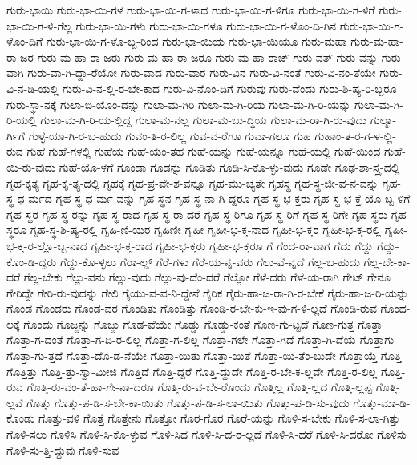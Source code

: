 {ಗುರು-ಭಾಯಿ
ಗುರು-ಭಾ-ಯಿ-ಗಳ
ಗುರು-ಭಾ-ಯಿ-ಗ-ಳಾದ
ಗುರು-ಭಾ-ಯಿ-ಗ-ಳಿಗೂ
ಗುರು-ಭಾ-ಯಿ-ಗ-ಳಿಗೆ
ಗುರು-ಭಾ-ಯಿ-ಗ-ಳಿ-ಗೆಲ್ಲ
ಗುರು-ಭಾ-ಯಿ-ಗಳು
ಗುರು-ಭಾ-ಯಿ-ಗಳೂ
ಗುರು-ಭಾ-ಯಿ-ಗ-ಳೊಂ-ದಿ-ಗಿನ
ಗುರು-ಭಾ-ಯಿ-ಗ-ಳೊಂ-ದಿಗೆ
ಗುರು-ಭಾ-ಯಿ-ಗ-ಳೊ-ಬ್ಬ-ರಿಂದ
ಗುರು-ಭಾ-ಯಿಯ
ಗುರು-ಭಾ-ಯಿಯೂ
ಗುರು-ಮಹಾ
ಗುರು-ಮ-ಹಾ-ರಾ-ಜರ
ಗುರು-ಮ-ಹಾ-ರಾ-ಜರು
ಗುರು-ಮ-ಹಾ-ರಾ-ಜರೂ
ಗುರು-ಮ-ಹಾ-ರಾಜ್
ಗುರು-ವತ್
ಗುರು-ವನ್ನು
ಗುರು-ವಾಗಿ
ಗುರು-ವಾ-ಗಿ-ದ್ದಾ-ರೆಯೋ
ಗುರು-ವಾದ
ಗುರು-ವಾರ
ಗುರು-ವಿನ
ಗುರು-ವಿ-ನಂತೆ
ಗುರು-ವಿ-ನಂ-ತೆಯೇ
ಗುರು-ವಿ-ನ-ಡಿ-ಯಲ್ಲಿ
ಗುರು-ವಿ-ನ-ಲ್ಲಿ-ರ-ಬೇ-ಕಾದ
ಗುರು-ವಿ-ನೊಂ-ದಿಗೆ
ಗುರುವು
ಗುರು-ವೆಂದು
ಗುರು-ಶಿ-ಷ್ಯ-ರಿ-ಬ್ಬರೂ
ಗುರು-ಸ್ಥಾ-ನಕ್ಕೆ
ಗುಲಾ-ಬಿ-ಯೊಂ-ದನ್ನು
ಗುಲಾ-ಮ-ಗಿರಿ
ಗುಲಾ-ಮ-ಗಿ-ರಿಯ
ಗುಲಾ-ಮ-ಗಿ-ರಿ-ಯನ್ನು
ಗುಲಾ-ಮ-ಗಿ-ರಿ-ಯಲ್ಲಿ
ಗುಲಾ-ಮ-ಗಿ-ರಿ-ಯ-ಲ್ಲಿದ್ದ
ಗುಲಾ-ಮ-ನಲ್ಲ
ಗುಲಾ-ಮ-ಬು-ದ್ಧಿಯ
ಗುಲಾ-ಮ-ರಾ-ಗಿ-ರು-ವುದು
ಗುಲ್ಮಾ-ರ್ಗಿಗೆ
ಗುಳ್ಳೆ-ಯಾ-ಗಿ-ರ-ಬ-ಹುದು
ಗುವಂ-ತಿ-ರ-ಲಿಲ್ಲ
ಗುವ-ವ-ರೆಗೂ
ಗುವಾ-ಗಲೂ
ಗುಹ
ಗುಹಾಂ-ತ-ರ-ಗ-ಳ-ಲ್ಲಿ-ರುವ
ಗುಹೆ
ಗುಹೆ-ಗಳಲ್ಲಿ
ಗುಹೆಯ
ಗುಹೆ-ಯಂ-ತಹ
ಗುಹೆ-ಯನ್ನು
ಗುಹೆ-ಯನ್ನೂ
ಗುಹೆ-ಯಲ್ಲಿ
ಗುಹೆ-ಯಿಂದ
ಗುಹೆ-ಯಿ-ರು-ವುದು
ಗುಹೆ-ಯೊ-ಳಗೆ
ಗೂಂಡಾ
ಗೂಡನ್ನು
ಗೂಡಿತು
ಗೂಡಿ-ಸಿ-ಕೊ-ಳ್ಳು-ವುದು
ಗೂಡೇ
ಗೂಢ-ಶಾ-ಸ್ತ್ರ-ದಲ್ಲಿ
ಗೃಹ-ಕೃತ್ಯ
ಗೃಹ-ಕೃ-ತ್ಯ-ದಲ್ಲಿ
ಗೃಹಕ್ಕೆ
ಗೃಹ-ಪ್ರ-ವೇ-ಶ-ವನ್ನೂ
ಗೃಹ-ಮು-ಚ್ಯತೇ
ಗೃಹಸ್ಥ
ಗೃಹ-ಸ್ಥ-ಜೀ-ವ-ನ-ವನ್ನು
ಗೃಹ-ಸ್ಥ-ಧ-ರ್ಮದ
ಗೃಹ-ಸ್ಥ-ಧ-ರ್ಮ-ವನ್ನು
ಗೃಹ-ಸ್ಥನ
ಗೃಹ-ಸ್ಥ-ನಾ-ಗಿ-ದ್ದರೂ
ಗೃಹ-ಸ್ಥ-ಭ-ಕ್ತರು
ಗೃಹ-ಸ್ಥ-ಭ-ಕ್ತೆ-ಯೊ-ಬ್ಬ-ಳಿಗೆ
ಗೃಹ-ಸ್ಥರ
ಗೃಹ-ಸ್ಥ-ರನ್ನು
ಗೃಹ-ಸ್ಥ-ರಾದ
ಗೃಹ-ಸ್ಥ-ರಾ-ದರೆ
ಗೃಹ-ಸ್ಥ-ರಿಗೂ
ಗೃಹ-ಸ್ಥ-ರಿಗೆ
ಗೃಹ-ಸ್ಥ-ರಿಗೇ
ಗೃಹ-ಸ್ಥರು
ಗೃಹ-ಸ್ಥರೂ
ಗೃಹ-ಸ್ಥ-ಶಿ-ಷ್ಯ-ರಲ್ಲಿ
ಗೃಹಿ-ಣಿ-ಯರ
ಗೃಹಿಣೀ
ಗೃಹೀ
ಗೃಹೀ-ಭ-ಕ್ತ-ನಾದ
ಗೃಹೀ-ಭ-ಕ್ತರ
ಗೃಹೀ-ಭ-ಕ್ತ-ರಲ್ಲಿ
ಗೃಹೀ-ಭ-ಕ್ತ-ರ-ಲ್ಲೊ-ಬ್ಬ-ನಾದ
ಗೃಹೀ-ಭ-ಕ್ತ-ರಾದ
ಗೃಹೀ-ಭ-ಕ್ತರು
ಗೃಹೀ-ಭ-ಕ್ತರೂ
ಗೆ
ಗೆಂದ-ರಾ-ವಾಗ
ಗೆದು
ಗೆದ್ದು
ಗೆದ್ದು-ಕೊಂ-ಡಿ-ದ್ದರು
ಗೆದ್ದು-ಕೊ-ಳ್ಳಲು
ಗೆರಾ-ಲ್ಡ್
ಗೆರೆ-ಗಳು
ಗೆರೆ-ಯ-ನ್ನ-ವರು
ಗೆಲು-ವೆ-ನ್ನದೆ
ಗೆಲ್ಲ-ಬ-ಹುದು
ಗೆಲ್ಲ-ಬೇ-ಕಾ-ದರೆ
ಗೆಲ್ಲ-ಬೇಕು
ಗೆಲ್ಲು-ವನು
ಗೆಲ್ಲು-ವುದು
ಗೆಲ್ಲು-ವು-ದೆಂ-ದರೆ
ಗೆಲ್ಲೋ
ಗೆಳೆ-ದರು
ಗೆಳೆ-ಯ-ರಾಗಿ
ಗೇಟ್
ಗೇನೂ
ಗೇರಿದ್ದೇ
ಗೇರಿ-ರು-ವುದನ್ನು
ಗೇಲಿ
ಗೈಯು-ವ-ವ-ನಿ-ದ್ದೇನೆ
ಗೈರಿಕ
ಗೈರು-ಹಾ-ಜ-ರಾ-ಗಿ-ರ-ಬೇಕೆ
ಗೈರು-ಹಾ-ಜ-ರಿ-ಯನ್ನು
ಗೊಂಡ
ಗೊಂಡರು
ಗೊಂಡ-ವರ
ಗೊಂಡಿತು
ಗೊಂಡಿತ್ತು
ಗೊಂಡಿ-ರ-ಬೇ-ಕು-ಇ-ವು-ಗ-ಳಿ-ಲ್ಲದೆ
ಗೊಂಡಿ-ರುವ
ಗೊಂದ-ಲಕ್ಕೆ
ಗೊಂದು
ಗೊಜ್ಜನ್ನು
ಗೊಜ್ಜು
ಗೊಡ-ವೆಯೇ
ಗೊಡ್ಡು
ಗೊಡ್ಡು-ಕಂತೆ
ಗೊಣ-ಗು-ಟ್ಟದೆ
ಗೊಣ-ಗುತ್ತ
ಗೊತ್ತಾ
ಗೊತ್ತಾ-ಗ-ದಂತೆ
ಗೊತ್ತಾ-ಗ-ದಿ-ರ-ಲಿಲ್ಲ
ಗೊತ್ತಾ-ಗ-ಲಿಲ್ಲ
ಗೊತ್ತಾ-ಗಲೇ
ಗೊತ್ತಾ-ಗಿದೆ
ಗೊತ್ತಾ-ಗಿ-ದೆಯೆ
ಗೊತ್ತಾಗು
ಗೊತ್ತಾ-ಗು-ತ್ತದೆ
ಗೊತ್ತಾ-ದೊ-ಡ-ನೆಯೇ
ಗೊತ್ತಾ-ಯಿತು
ಗೊತ್ತಾ-ಯಿತೆ
ಗೊತ್ತಾ-ಯಿ-ತೆಂ-ಬುದೇ
ಗೊತ್ತಾಯ್ತೆ
ಗೊತ್ತಿ
ಗೊತ್ತಿತ್ತು
ಗೊತ್ತಿ-ತ್ತು-ಸ್ವಾ-ಮೀಜಿ
ಗೊತ್ತಿದೆ
ಗೊತ್ತಿ-ದ್ದರೆ
ಗೊತ್ತಿ-ದ್ದುದೇ
ಗೊತ್ತಿ-ರ-ಬೇ-ಕ-ಲ್ಲವೇ
ಗೊತ್ತಿ-ರ-ಲಿಲ್ಲ
ಗೊತ್ತಿ-ರುವ
ಗೊತ್ತಿ-ರು-ವಂ-ತೆ-ಹಾ-ಗೇ-ನಾ-ದರೂ
ಗೊತ್ತಿ-ರು-ವ-ಬೇ-ರೊಂದು
ಗೊತ್ತಿಲ್ಲ
ಗೊತ್ತಿ-ಲ್ಲದ
ಗೊತ್ತಿ-ಲ್ಲಪ್ಪ
ಗೊತ್ತಿ-ಲ್ಲವೆ
ಗೊತ್ತು
ಗೊತ್ತು-ಪ-ಡಿ-ಸ-ಬೇ-ಕಾ-ಯಿತು
ಗೊತ್ತು-ಪ-ಡಿ-ಸ-ಲಾ-ಯಿತು
ಗೊತ್ತು-ಪ-ಡಿ-ಸು-ವುದು
ಗೊತ್ತು-ಮಾ-ಡಿ-ಕೊಂಡು
ಗೊತ್ತು-ವಳಿ
ಗೊತ್ತೆ
ಗೊತ್ತೇನು
ಗೊತ್ತೋ
ಗೊರ-ಗೊರ
ಗೊರೆ-ಯನ್ನು
ಗೊಳಿ-ಸ-ಬೇಕು
ಗೊಳಿ-ಸ-ಲಾ-ಗಿತ್ತು
ಗೊಳಿ-ಸಲು
ಗೊಳಿಸಿ
ಗೊಳಿ-ಸಿ-ಕೊ-ಳ್ಳುವ
ಗೊಳಿ-ಸಿದ
ಗೊಳಿ-ಸಿ-ದ-ರ-ಲ್ಲದೆ
ಗೊಳಿ-ಸಿ-ದರೆ
ಗೊಳಿ-ಸಿ-ದರೋ
ಗೊಳಿಸು
ಗೊಳಿ-ಸು-ತ್ತಿ-ದ್ದುವು
ಗೊಳಿ-ಸುವ
}
